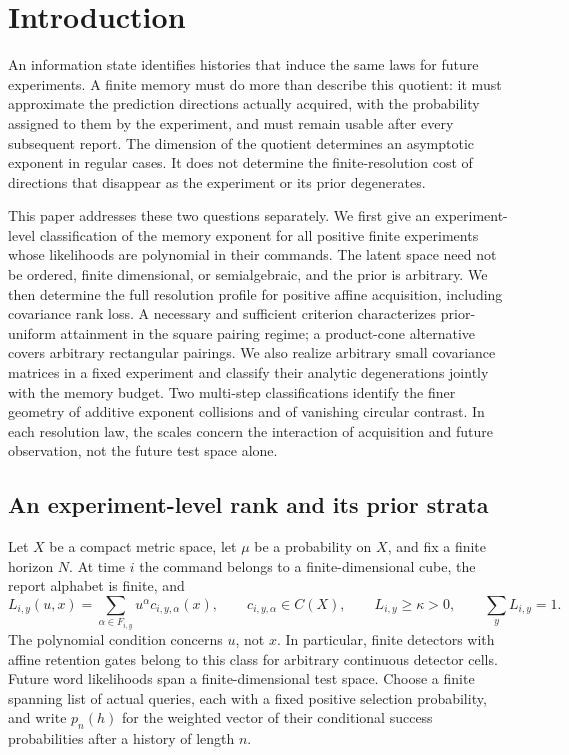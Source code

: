 \section{Introduction}
An information state identifies histories that induce the same laws for
future experiments. A finite memory must do more than describe this
quotient: it must approximate the prediction directions actually
acquired, with the probability assigned to them by the experiment, and
must remain usable after every subsequent report. The dimension of the
quotient determines an asymptotic exponent in regular cases. It does
not determine the finite-resolution cost of directions that disappear
as the experiment or its prior degenerates.

This paper addresses these two questions separately. We first give an
experiment-level classification of the memory exponent for all positive
finite experiments whose likelihoods are polynomial in their commands.
The latent space need not be ordered, finite dimensional, or
semialgebraic, and the prior is arbitrary. We then determine the full
resolution profile for positive affine acquisition, including covariance
rank loss. A necessary and sufficient criterion characterizes
prior-uniform attainment in the square pairing regime; a product-cone
alternative covers arbitrary rectangular pairings. We also realize
arbitrary small covariance matrices in a fixed experiment and classify
their analytic degenerations jointly with the memory budget. Two multi-step
classifications identify the finer geometry of additive exponent
collisions and of vanishing circular contrast. In each resolution law,
the scales concern the interaction of acquisition and future observation,
not the future test space alone.

\subsection{An experiment-level rank and its prior strata}
Let $X$ be a compact metric space, let $\mu$ be a probability on $X$,
and fix a finite horizon $N$. At time $i$ the command belongs to a
finite-dimensional cube, the report alphabet is finite, and
\[
 L_{i,y}(u,x)=\sum_{\alpha\in F_{i,y}}u^\alpha c_{i,y,\alpha}(x),
 \qquad c_{i,y,\alpha}\in C(X),\qquad L_{i,y}\ge\kappa>0,
 \qquad\sum_yL_{i,y}=1.
\]
The polynomial condition concerns $u$, not $x$. In particular, finite
detectors with affine retention gates belong to this class for arbitrary
continuous detector cells. Future word likelihoods span a
finite-dimensional test space. Choose a finite spanning list of actual
queries, each with a fixed positive selection probability, and write
$p_n(h)$ for the weighted vector of their conditional success
probabilities after a history of length $n$.

